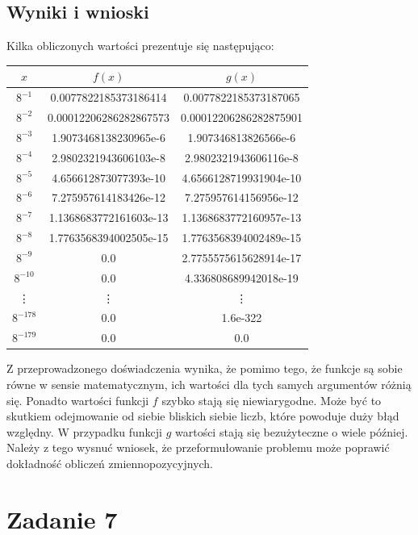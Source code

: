 \documentclass{article}
\begin{document}
\subsection{Wyniki i wnioski}
Kilka obliczonych wartości prezentuje się następująco:
\begin{table}[h!]
    \centering
    \begin{tabular}{|c|c|c|}
    \hline
    $x$ & $f(x)$ & $g(x)$ \\
    \hline
    $8^{-1}$ & 0.0077822185373186414 & 0.0077822185373187065 \\
    \hline
    $8^{-2}$ & 0.00012206286282867573 & 0.00012206286282875901 \\
    \hline
    $8^{-3}$ & 1.9073468138230965e-6 & 1.907346813826566e-6 \\
    \hline
    $8^{-4}$ & 2.9802321943606103e-8 & 2.9802321943606116e-8 \\
    \hline
    $8^{-5}$ & 4.656612873077393e-10 & 4.6566128719931904e-10 \\
    \hline
    $8^{-6}$ & 7.275957614183426e-12 & 7.275957614156956e-12 \\
    \hline
    $8^{-7}$ & 1.1368683772161603e-13 & 1.1368683772160957e-13 \\
    \hline
    $8^{-8}$ & 1.7763568394002505e-15 & 1.7763568394002489e-15 \\
    \hline
    $8^{-9}$ & 0.0 & 2.7755575615628914e-17 \\
    \hline
    $8^{-10}$ & 0.0 & 4.336808689942018e-19 \\
    \vdots & \vdots & \vdots \\
    $8^{-178}$ & 0.0 & 1.6e-322 \\
    \hline
    $8^{-179}$ & 0.0 & 0.0 \\
    \hline
    \end{tabular}
\end{table}

Z przeprowadzonego doświadczenia wynika, że pomimo tego, że funkcje są sobie równe w sensie matematycznym, ich wartości dla tych samych argumentów różnią się.
Ponadto wartości funkcji $f$ szybko stają się niewiarygodne. Może być to skutkiem odejmowanie od siebie bliskich siebie liczb, które powoduje duży błąd względny.
\newline W przypadku funkcji $g$ wartości stają się bezużyteczne o wiele później. Należy z tego wysnuć wniosek, że przeformułowanie problemu może poprawić dokładność obliczeń zmiennopozycyjnych.

\section{Zadanie 7}
\end{document}
